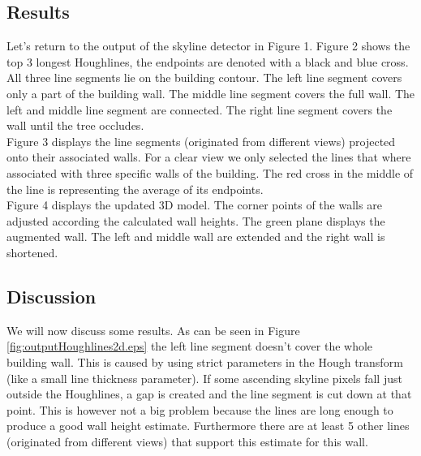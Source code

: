 \documentclass[10pt]{article}
\begin{document}
{\subsection{Results}
\noindent
{}
Let's return to the output of the skyline detector in Figure 1.
Figure 2
shows the top 3 longest Houghlines, the
endpoints are denoted with a black and blue cross. All three line segments lie on the
building contour.  The left line segment covers only a part of the building wall. The
middle line segment covers the full wall. The left and middle line segment are connected. The
right line segment covers the wall until the tree occludes.\\

Figure %
3 displays the line segments (originated from
different views) projected onto their associated walls.  For a clear view we
only selected the lines that where associated with three specific walls of the building.  
The red cross in the middle of the line is representing the average of its endpoints.\\

Figure 4 %
displays the updated 3D model. The
corner points of the walls are adjusted according the calculated wall heights.
The green plane displays the augmented wall. The left and middle wall are extended
and the right wall is shortened.\\


\subsection{Discussion}
We will now discuss some results. As can be seen in Figure
\ref{fig:outputHoughlines2d.eps} the left line segment doesn't cover the whole
building wall. This is caused by using strict parameters in the Hough transform
(like a small line thickness parameter).  If some ascending skyline pixels fall just outside
the Houghlines, a gap is created and the line segment is cut down at that point.
This is however not a big problem because the lines are long enough to produce a
good wall height estimate. Furthermore there are at least 5 other lines
(originated from different views) that support this estimate for this wall.\\



}
\end{document}
